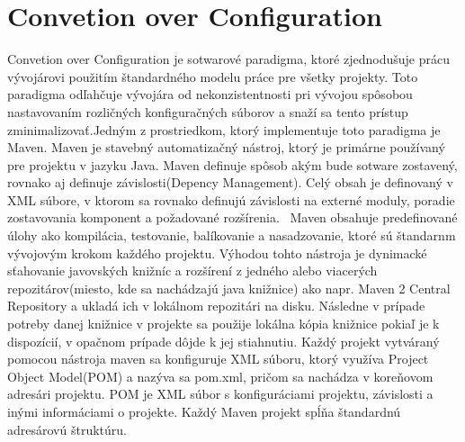 \section{Convetion over Configuration}\label{mavenkap}
Convetion over Configuration je sotwarové paradigma, ktoré zjednodušuje prácu vývojárovi použitím štandardného modelu práce pre všetky projekty. Toto paradigma odľahčuje vývojára od nekonzistentnosti pri vývojou spôsobou nastavovaním rozličných konfiguračných súborov a snaží sa tento prístup zminimalizovať.\newline \indent Jedným z prostriedkom, ktorý implementuje toto paradigma je Maven. Maven je stavebný automatizačný nástroj, ktorý je primárne používaný pre projektu v jazyku Java. Maven definuje spôsob akým bude sotware zostavený, rovnako aj definuje závislosti(Depency Management). Celý obsah je definovaný v XML súbore, v ktorom sa rovnako definujú závislosti na externé moduly, poradie zostavovania komponent a požadované rozšírenia. 
\newline \indent Maven obsahuje predefinované úlohy ako kompilácia, testovanie, balíkovanie a nasadzovanie, ktoré sú štandarnm vývojovým krokom každého projektu. Výhodou tohto nástroja je dynimacké sťahovanie javovských knižníc a rozšírení z jedného alebo viacerých repozitárov(miesto, kde sa nachádzajú java knižnice) ako napr. Maven 2 Central Repository a ukladá ich v lokálnom repozitári na disku. Následne v prípade potreby danej knižnice v projekte sa použije lokálna kópia knižnice pokiaľ je k dispozícií, v opačnom prípade dôjde k jej stiahnutiu. \newline \indent Každý projekt vytváraný pomocou nástroja maven sa konfiguruje XML súboru, ktorý využíva Project Object Model(POM) a nazýva sa pom.xml, pričom sa nachádza v koreňovom adresári projektu. POM je XML súbor s konfiguráciami projektu, závislosti a inými informáciami o projekte. Každý Maven projekt spĺňa štandardnú adresárovú štruktúru.

